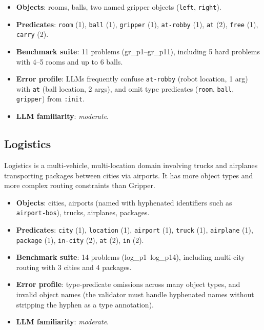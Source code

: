 \documentclass{article}
\begin{document}
\begin{itemize}[leftmargin=1.5em]
  \item \textbf{Objects}: rooms, balls, two named gripper objects (\texttt{left},
        \texttt{right}).
  \item \textbf{Predicates}: \texttt{room} (1), \texttt{ball} (1), \texttt{gripper} (1),
        \texttt{at-robby} (1), \texttt{at} (2), \texttt{free} (1), \texttt{carry} (2).
  \item \textbf{Benchmark suite}: 11 problems (gr\_p1--gr\_p11), including 5 hard problems
        with 4--5 rooms and up to 6 balls.
  \item \textbf{Error profile}: LLMs frequently confuse \texttt{at-robby} (robot
        location, 1 arg) with \texttt{at} (ball location, 2 args), and omit
        type predicates (\texttt{room}, \texttt{ball}, \texttt{gripper}) from
        \texttt{:init}.
  \item \textbf{LLM familiarity}: \emph{moderate}.
\end{itemize}

\subsection{Logistics}
\label{sec:logistics}

Logistics is a multi-vehicle, multi-location domain involving trucks and airplanes
transporting packages between cities via airports.  It has more object types and
more complex routing constraints than Gripper.

\begin{itemize}[leftmargin=1.5em]
  \item \textbf{Objects}: cities, airports (named with hyphenated identifiers such as
        \texttt{airport-bos}), trucks, airplanes, packages.
  \item \textbf{Predicates}: \texttt{city} (1), \texttt{location} (1), \texttt{airport} (1),
        \texttt{truck} (1), \texttt{airplane} (1), \texttt{package} (1), \texttt{in-city} (2),
        \texttt{at} (2), \texttt{in} (2).
  \item \textbf{Benchmark suite}: 14 problems (log\_p1--log\_p14), including multi-city
        routing with 3 cities and 4 packages.
  \item \textbf{Error profile}: type-predicate omissions across many object types, and
        invalid object names (the validator must handle hyphenated names without
        stripping the hyphen as a type annotation).
  \item \textbf{LLM familiarity}: \emph{moderate}.
\end{itemize}
\end{document}
